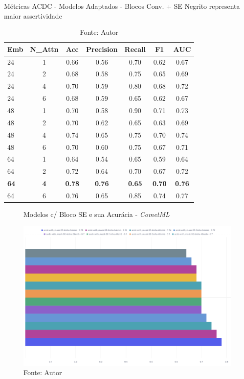 \begin{table}[htbp]
\centering
\caption{Métricas ACDC - Modelos Adaptados - Blocos Conv. + SE
\newline Negrito representa maior assertividade}
\begin{tabular}{lcccccc}
\toprule
\textbf{Emb} & \textbf{N\_Attn} & \textbf{Acc} & \textbf{Precision} & \textbf{Recall} & \textbf{F1} & \textbf{AUC} \\
\midrule
24 & 1 & 0.66 & 0.56 & 0.70 & 0.62 & 0.67 \\
24 & 2 & 0.68 & 0.58 & 0.75 & 0.65 & 0.69 \\
24 & 4 & 0.70 & 0.59 & 0.80 & 0.68 & 0.72 \\
24 & 6 & 0.68 & 0.59 & 0.65 & 0.62 & 0.67 \\
\hline
48 & 1 & 0.70 & 0.58 & 0.90 & 0.71 & 0.73 \\
48 & 2 & 0.70 & 0.62 & 0.65 & 0.63 & 0.69 \\
48 & 4 & 0.74 & 0.65 & 0.75 & 0.70 & 0.74 \\
48 & 6 & 0.70 & 0.60 & 0.75 & 0.67 & 0.71 \\
\hline
64 & 1 & 0.64 & 0.54 & 0.65 & 0.59 & 0.64 \\
64 & 2 & 0.72 & 0.64 & 0.70 & 0.67 & 0.72 \\
\textbf{64} & \textbf{4} & \textbf{0.78} & \textbf{0.76} & \textbf{0.65} & \textbf{0.70} & \textbf{0.76} \\
64 & 6 & 0.76 & 0.65 & 0.85 & 0.74 & 0.77 \\
\bottomrule
\end{tabular}
\caption*{Fonte: Autor}
\label{tab:metrics_acdc_se}
\end{table}


\begin{figure}[h!]
    \centering
    \caption{Modelos c/ Bloco SE e sua Acurácia - \textit{CometML}}
    \includegraphics[width=1\textwidth]{figures/fig032.png}
    \caption*{Fonte: Autor}
    \label{fig:fig032}
\end{figure}

